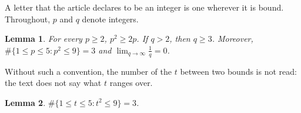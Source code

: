\documentclass{article}
\newtheorem{lemma}{Lemma}
\begin{document}
A letter that the article declares to be an integer is one wherever it is bound.
Throughout, $p$ and $q$ denote integers.

\begin{lemma}\label{lem:letters}
For every $p\ge2$, $p^2\ge2p$.
If $q>2$, then $q\ge3$.
Moreover, $\#\{1\le p\le5 : p^2\le9\}=3$ and $\lim_{q\to\infty}\frac1q=0$.
\end{lemma}

Without such a convention, the number of the $t$ between two bounds is not read: the text does not say what $t$ ranges over.

\begin{lemma}\label{lem:unstated}
$\#\{1\le t\le5 : t^2\le9\}=3$.
\end{lemma}
\end{document}
